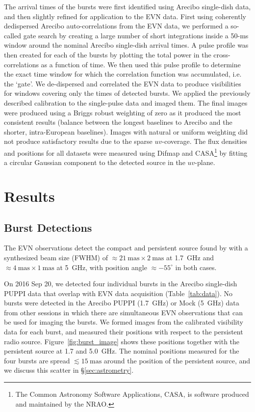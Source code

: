 \documentclass[twocolumn]{aastex61}
\newcommand{\degree}{^{\circ}\xspace}
\begin{document}
The arrival times of the bursts were first identified using Arecibo single-dish data, and then slightly refined for application to the EVN data.  First using coherently dedispersed Arecibo auto-correlations from the EVN data, we performed a so-called gate search by creating a large number of short integrations inside a 50-ms window around the nominal Arecibo single-dish arrival times. A pulse profile was then created for each of the bursts by plotting the total power in the cross-correlations as a function of time.  We then used this pulse profile to determine the exact time window for which the correlation function was accumulated, i.e. the `gate'.  We de-dispersed and correlated the EVN data to produce visibilities for windows covering only the times of detected bursts.  We applied the previously described calibration to the single-pulse data and imaged them.  The final images were produced using a Briggs robust weighting of zero \citep{briggs1995} as it produced the most consistent results (balance between the longest baselines to Arecibo and the shorter, intra-European baselines).  Images with natural or uniform weighting did not produce satisfactory results due to the sparse $uv$-coverage.  The flux densities and positions for all datasets were measured using Difmap and CASA\footnote{The Common Astronomy Software Applications, CASA, is software produced and maintained by the NRAO.} by fitting a circular Gaussian component to the detected source in the $uv$-plane.

\section{Results} \label{sec:results}

\subsection{Burst Detections}

The EVN observations detect the compact and persistent source found by \citet{chatterjee2017} with a synthesized beam size (FWHM) of $\approx 21~\mathrm{mas} \times 2~\mathrm{mas}$ at 1.7~GHz and $\approx 4~\mathrm{mas} \times 1~\mathrm{mas}$ at 5~GHz, with position angle $\approx - 55\degree$ in both cases.

On 2016 Sep 20, we detected four individual bursts in the Arecibo single-dish PUPPI data that overlap with EVN data acquisition (Table~\ref{tab:data}).  No bursts were detected in the Arecibo PUPPI (1.7~GHz) or Mock (5~GHz) data from other sessions in which there are simultaneous EVN observations that can be used for imaging the bursts.  We formed images from the calibrated visibility data for each burst, and measured their positions with respect to the persistent radio source. Figure~\ref{fig:burst_image} shows these positions together with the persistent source at 1.7 and 5.0~GHz. The nominal positions measured for the four bursts are spread $\lesssim 15~\mathrm{mas}$ around the position of the persistent source, and we discuss this scatter in \S\ref{sec:astrometry}.
\end{document}
